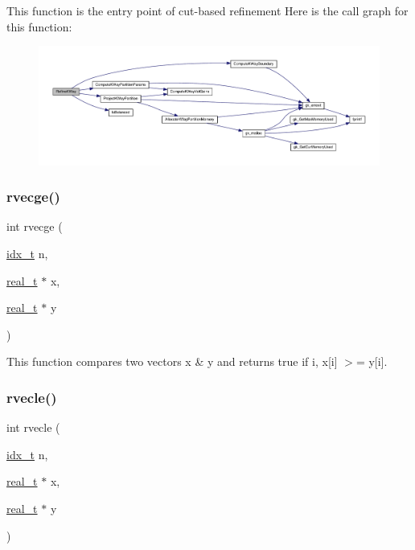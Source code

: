 This function is the entry point of cut-\/based refinement Here is the call graph for this function\+:\nopagebreak
\begin{figure}[H]
\begin{center}
\leavevmode
\includegraphics[width=350pt]{a00945_adeb3fad496482fea745a00c7b39ca7cf_cgraph}
\end{center}
\end{figure}
\mbox{\label{a00945_afa3eca456cb1fb976b0a12e8a64476f6}} 
\subsubsection{\texorpdfstring{rvecge()}{rvecge()}}
{\footnotesize\ttfamily int rvecge (\begin{DoxyParamCaption}\item[{\hyperlink{a00876_aaa5262be3e700770163401acb0150f52}{idx\+\_\+t}}]{n,  }\item[{\hyperlink{a00876_a1924a4f6907cc3833213aba1f07fcbe9}{real\+\_\+t} $\ast$}]{x,  }\item[{\hyperlink{a00876_a1924a4f6907cc3833213aba1f07fcbe9}{real\+\_\+t} $\ast$}]{y }\end{DoxyParamCaption})}

This function compares two vectors x \& y and returns true if  i, x\mbox{[}i\mbox{]} $>$= y\mbox{[}i\mbox{]}. \mbox{\label{a00945_afc1c6165b92dba30458b99cecffbd82e}} 
\subsubsection{\texorpdfstring{rvecle()}{rvecle()}}
{\footnotesize\ttfamily int rvecle (\begin{DoxyParamCaption}\item[{\hyperlink{a00876_aaa5262be3e700770163401acb0150f52}{idx\+\_\+t}}]{n,  }\item[{\hyperlink{a00876_a1924a4f6907cc3833213aba1f07fcbe9}{real\+\_\+t} $\ast$}]{x,  }\item[{\hyperlink{a00876_a1924a4f6907cc3833213aba1f07fcbe9}{real\+\_\+t} $\ast$}]{y }\end{DoxyParamCaption})}

